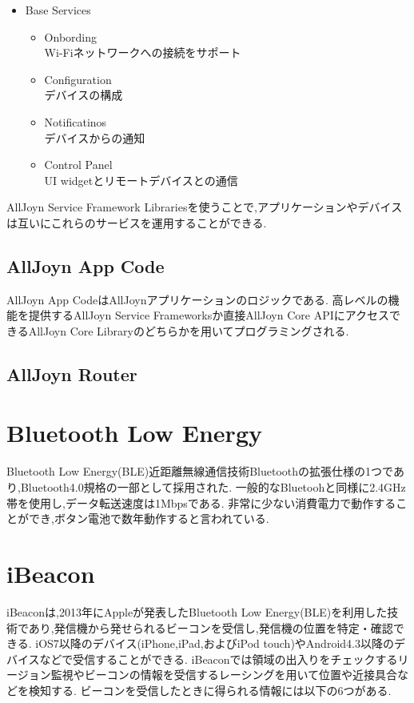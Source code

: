 \begin{itemize}
\item Base Services
\begin{itemize}
\item Onbording \\
Wi-Fiネットワークへの接続をサポート
\item Configuration \\
デバイスの構成
\item Notificatinos \\
デバイスからの通知
\item Control Panel \\
UI widgetとリモートデバイスとの通信
\end{itemize}
\end{itemize}

AllJoyn Service Framework Librariesを使うことで,アプリケーションやデバイスは互いにこれらのサービスを運用することができる.


\subsection{AllJoyn App Code}
AllJoyn App CodeはAllJoynアプリケーションのロジックである.
高レベルの機能を提供するAllJoyn Service Frameworksか直接AllJoyn Core APIにアクセスできるAllJoyn Core Libraryのどちらかを用いてプログラミングされる.

\subsection{AllJoyn Router}


\section{Bluetooth Low Energy}
Bluetooth Low Energy(BLE)\cite{BLE1}\cite{BLE2}近距離無線通信技術Bluetoothの拡張仕様の1つであり,Bluetooth4.0規格の一部として採用された.
一般的なBluetoohと同様に2.4GHz帯を使用し,データ転送速度は1Mbpsである.
非常に少ない消費電力で動作することができ,ボタン電池で数年動作すると言われている.

\section{iBeacon}
iBeacon\cite{iBeacon}\cite{iBeaconを使用してみよう}は,2013年にAppleが発表したBluetooth Low Energy(BLE)を利用した技術であり,発信機から発せられるビーコンを受信し,発信機の位置を特定・確認できる.
iOS7以降のデバイス(iPhone,iPad,およびiPod touch)やAndroid4.3以降のデバイスなどで受信することができる.
iBeaconでは領域の出入りをチェックするリージョン監視やビーコンの情報を受信するレーシングを用いて位置や近接具合などを検知する.
ビーコンを受信したときに得られる情報には以下の6つがある.


